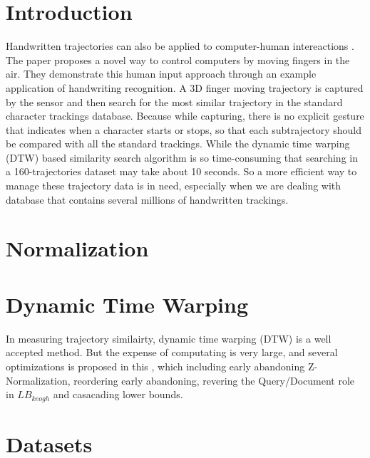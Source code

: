 \documentclass[sigconf]{acmart}
\begin{document}



\maketitle

\section{Introduction}
Handwritten trajectories can also be applied to computer-human intereactions \cite{VikramLR13}. The paper proposes a novel way to control computers by moving fingers in the air. They demonstrate this human input approach through an example application of handwriting recognition. A 3D finger moving trajectory is captured by the sensor and then search for the most similar trajectory in the standard character trackings database. Because while capturing, there is no explicit gesture that indicates when a character starts or stops, so that each subtrajectory should be compared with all the standard trackings.  While the dynamic time warping (DTW)  based similarity search algorithm is so time-consuming  that searching in a 160-trajectories dataset may take about 10 seconds. So a more efficient way to manage these trajectory data is in need, especially when we are dealing with database that contains several millions of handwritten trackings. 






\section{Normalization}



\section{Dynamic Time Warping}
In measuring trajectory similairty, dynamic time warping (DTW) is a well accepted method. But the expense of computating is very large, and several optimizations is proposed in this \cite{RakthanmanonDTW}, which including early abandoning Z-Normalization, reordering early abandoning, revering the Query/Document role in $LB_{keogh}$ and casacading lower bounds.

\section{Datasets}





\end{document}
